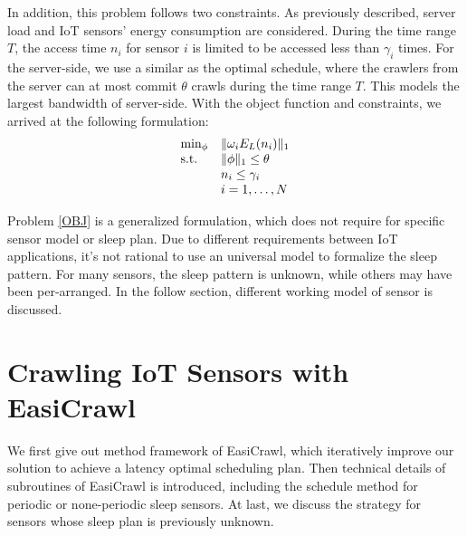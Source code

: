 \documentclass[conference]{IEEEtran}
\begin{document}
In addition, this problem follows two constraints. As previously described, server load and IoT sensors' energy consumption are considered. 
During the time range $T$, the access time $n_i$ for sensor $i$ is limited to be accessed less than $\gamma_i$ times. 
For the server-side, we use a similar as the optimal schedule\cite{Wolf2002}, where the crawlers from the server can at most commit $\theta$ crawls during the time range $T$. This models the largest bandwidth of server-side.
With the object function and constraints, we arrived at the following formulation:
\begin{eqnarray}
\begin{array}{ll}
\min_{\phi}&\Arrowvert \omega_i E_{L}(n_{i}) \Arrowvert_{1}\\
\text{s.t.}
&\Arrowvert \phi \Arrowvert_{1}\leq\theta\\
&n_i\leq\gamma_i\\
&i=1,\ldots,N
\end{array}\label{OBJ}
\end{eqnarray}

Problem \eqref{OBJ} is a generalized formulation, which does not require for specific sensor model or sleep plan. Due to different requirements between IoT applications, it's not rational to use an universal model to formalize the sleep pattern. For many sensors, the sleep pattern is unknown, while others may have been per-arranged.  
In the follow section, different working model of sensor is discussed. 


\section{Crawling IoT Sensors with EasiCrawl} \label{easicrawl}

We first give out method framework of EasiCrawl, which iteratively improve our solution to achieve a latency optimal scheduling plan. 
Then technical details of subroutines of EasiCrawl is introduced, including the schedule method for periodic or none-periodic sleep sensors. At last, we discuss the strategy for sensors whose sleep plan is previously unknown.
\end{document}
